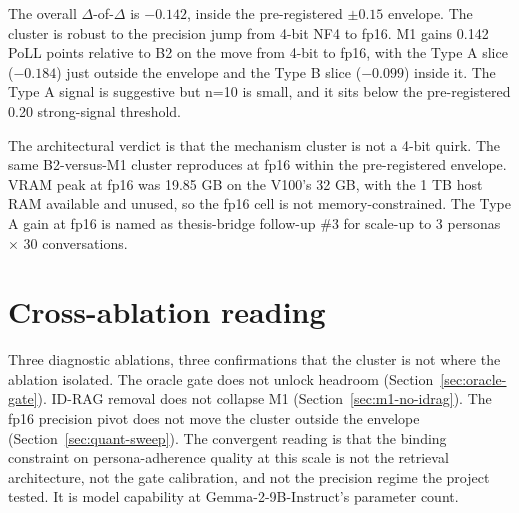 The overall $\Delta$-of-$\Delta$ is $-0.142$, inside the pre-registered $\pm 0.15$ envelope. The cluster is robust to the precision jump from 4-bit NF4 to fp16. M1 gains 0.142 PoLL points relative to B2 on the move from 4-bit to fp16, with the Type A slice ($-0.184$) just outside the envelope and the Type B slice ($-0.099$) inside it. The Type A signal is suggestive but n=10 is small, and it sits below the pre-registered 0.20 strong-signal threshold.

The architectural verdict is that the mechanism cluster is not a 4-bit quirk. The same B2-versus-M1 cluster reproduces at fp16 within the pre-registered envelope. VRAM peak at fp16 was 19.85 GB on the V100's 32 GB, with the 1 TB host RAM available and unused, so the fp16 cell is not memory-constrained. The Type A gain at fp16 is named as thesis-bridge follow-up \#3 for scale-up to 3 personas $\times$ 30 conversations.

\section{Cross-ablation reading}
\label{sec:cross-ablation}

Three diagnostic ablations, three confirmations that the cluster is not where the ablation isolated. The oracle gate does not unlock headroom (Section~\ref{sec:oracle-gate}). ID-RAG removal does not collapse M1 (Section~\ref{sec:m1-no-idrag}). The fp16 precision pivot does not move the cluster outside the envelope (Section~\ref{sec:quant-sweep}). The convergent reading is that the binding constraint on persona-adherence quality at this scale is not the retrieval architecture, not the gate calibration, and not the precision regime the project tested. It is model capability at Gemma-2-9B-Instruct's parameter count.

